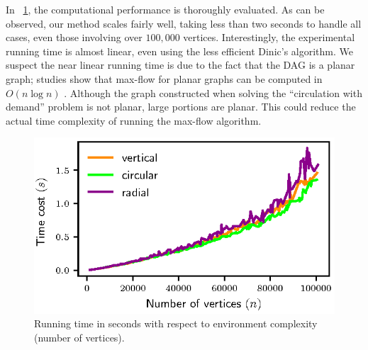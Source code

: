 In ~\ref{fig:simulations_runtime}, the computational performance is thoroughly 
evaluated. As can be observed, our method scales fairly well, taking less than two seconds
to handle all cases, even those involving over $100,000$ vertices. 
%
Interestingly, the experimental running time is almost linear, even using the less efficient Dinic's algorithm. 
%
We suspect the near linear running time is due to the fact that the DAG is 
a planar graph; studies show that max-flow for planar graphs can be computed 
in $O(n\log n)$ \cite{borradaile2009n}. 
%
Although the graph constructed when solving the ``circulation with demand'' problem is not planar, large portions are planar. 
This could reduce the actual time complexity of running the max-flow algorithm.

\begin{figure}[h]
\vspace{2mm}
    \centering
    \includegraphics[width=0.9\linewidth]{chapters/sc/fig/runtime.eps}
    \caption{Running time in seconds with respect to environment complexity (number of vertices). }
    \label{fig:simulations_runtime}
\end{figure}

